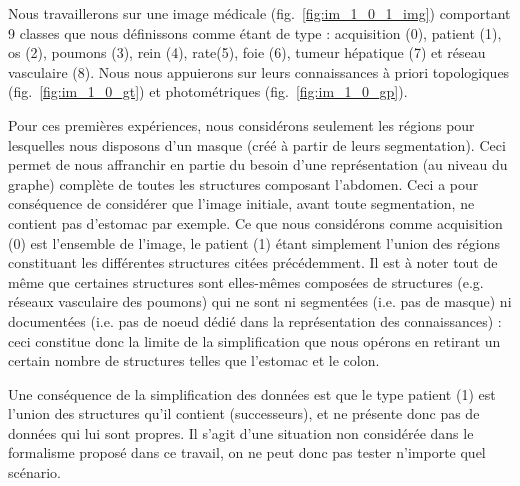 %
		Nous travaillerons sur une image médicale (fig.~\ref{fig:im_1_0_1_img}) comportant 9 classes que nous définissons comme étant de type : acquisition (0), patient (1), os (2), poumons (3), rein (4), rate(5), foie (6), tumeur hépatique (7) et réseau vasculaire (8). Nous nous appuierons sur leurs connaissances à priori topologiques (fig.~\ref{fig:im_1_0_gt}) et photométriques (fig.~\ref{fig:im_1_0_gp}). 
		
	
	Pour ces premières expériences, nous considérons seulement les régions pour lesquelles nous disposons d'un masque (créé à partir de leurs segmentation). Ceci permet de nous affranchir en partie du besoin d'une représentation (au niveau du graphe) complète de toutes les structures composant l'abdomen. Ceci a pour conséquence de considérer que l'image initiale, avant toute segmentation, ne contient pas d'estomac par exemple. Ce que nous considérons comme acquisition (0) est l'ensemble de l'image, le patient (1) étant simplement l'union des régions constituant les différentes structures citées précédemment. Il est à noter tout de même que certaines structures sont elles-mêmes composées de structures (e.g. réseaux vasculaire des poumons) qui ne sont ni segmentées (i.e. pas de masque) ni documentées (i.e. pas de noeud dédié dans la représentation des connaissances) : ceci constitue donc la limite de la simplification que nous opérons en retirant un certain nombre de structures telles que l'estomac et le colon. 

Une conséquence de la simplification des données est que le type patient (1) est l'union des structures qu'il contient (successeurs), et ne présente donc pas de données qui lui sont propres. Il s'agit d'une situation non considérée dans le formalisme proposé dans ce travail, on ne peut donc pas tester n'importe quel scénario.


